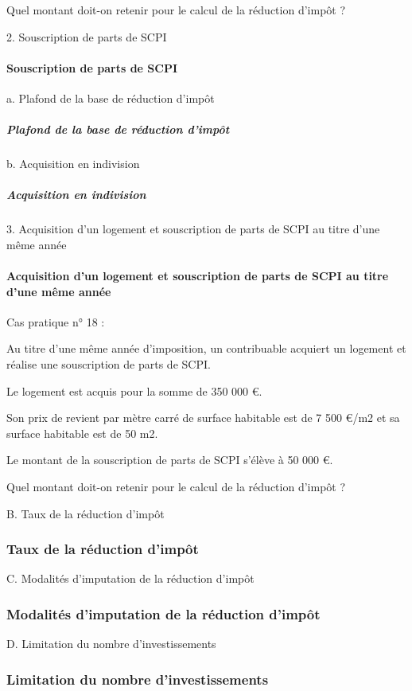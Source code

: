 Quel montant doit-on retenir pour le calcul de la réduction d’impôt ?


2. Souscription de parts de SCPI
				\paragraph{Souscription de parts de SCPI}


a. Plafond de la base de réduction d'impôt
					\subparagraph{Plafond de la base de réduction d'impôt}

b. Acquisition en indivision
					\subparagraph{Acquisition en indivision}


3. Acquisition d'un logement et souscription de parts de SCPI au titre d'une même année
				\paragraph{Acquisition d'un logement et souscription de parts de SCPI au titre d'une même année}


				Cas pratique n° 18 :

				Au titre d'une même année d'imposition, un contribuable acquiert un logement et réalise une souscription de parts de SCPI.

				Le logement est acquis pour la somme de 350 000 €.

				Son prix de revient par mètre carré de surface habitable est de 7 500 €/m2 et sa surface habitable est de 50 m2.

				Le montant de la souscription de parts de SCPI s'élève à 50 000 €.

				Quel montant doit-on retenir pour le calcul de la réduction d’impôt ?


B. Taux de la réduction d'impôt
			\subsubsection{Taux de la réduction d'impôt}


C. Modalités d'imputation de la réduction d'impôt
			\subsubsection{Modalités d'imputation de la réduction d'impôt}


D. Limitation du nombre d'investissements
			\subsubsection{Limitation du nombre d'investissements}



